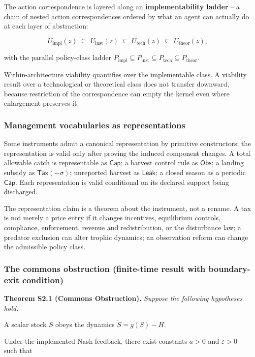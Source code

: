 The action correspondence is layered along an \textbf{implementability ladder} -- a chain of nested action correspondences ordered by what an agent can actually do at each layer of abstraction:

\[U_{\mathrm{impl}}(z) \;\subseteq\; U_{\mathrm{inst}}(z) \;\subseteq\; U_{\mathrm{tech}}(z) \;\subseteq\; U_{\mathrm{theor}}(z),\]

with the parallel policy-class ladder $P_{\mathrm{impl}} \subseteq P_{\mathrm{inst}} \subseteq P_{\mathrm{tech}} \subseteq P_{\mathrm{theor}}$.

Within-architecture viability quantifies over the implementable class. A viability result over a technological or theoretical class does not transfer downward, because restriction of the correspondence can empty the kernel even where enlargement preserves it.


\subsubsection{Management vocabularies as representations}

Some instruments admit a canonical representation by primitive constructors; the representation is valid only after proving the induced component changes. A total allowable catch is representable as $\mathsf{Cap}$; a harvest control rule as $\mathsf{Obs}$; a landing subsidy as $\mathsf{Tax}(-\sigma)$; unreported harvest as $\mathsf{Leak}$; a closed season as a periodic $\mathsf{Cap}$. Each representation is valid conditional on its declared support being discharged.

The representation claim is a theorem about the instrument, not a rename. A tax is not merely a price entry if it changes incentives, equilibrium controls, compliance, enforcement, revenue and redistribution, or the disturbance law; a predator exclusion can alter trophic dynamics; an observation reform can change the admissible policy class.


\subsubsection{The commons obstruction (finite-time result with boundary-exit condition)}

\textbf{Theorem S2.1 (Commons Obstruction).} \emph{Suppose the following hypotheses hold.}

\item[(H1)] A scalar stock $S$ obeys the dynamics $\dot S = g(S) - H$.
\item[(H2)] Under the implemented Nash feedback, there exist constants $a > 0$ and $\varepsilon > 0$ such that

